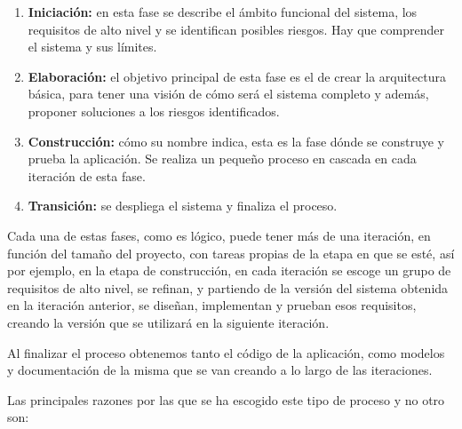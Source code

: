 \begin{enumerate}

    \item \textbf{Iniciación:} en esta fase se describe el ámbito funcional del sistema, los requisitos de alto nivel y se identifican posibles riesgos. Hay que comprender el sistema y sus límites.

    \item \textbf{Elaboración:} el objetivo principal de esta fase es el de crear la arquitectura básica, para tener una visión de cómo será el sistema completo y además, proponer soluciones a los riesgos identificados.

    \item \textbf{Construcción:} cómo su nombre indica, esta es la fase dónde se construye y prueba la aplicación. Se realiza un pequeño proceso en cascada en cada iteración de esta fase.

    \item \textbf{Transición:} se despliega el sistema y finaliza el proceso.

\end{enumerate}

Cada una de estas fases, como es lógico, puede tener más de una iteración, en función del tamaño del proyecto, con tareas propias de la etapa en que se esté, así por ejemplo, en la etapa de construcción, en cada iteración se escoge un grupo de requisitos de alto nivel, se refinan, y partiendo de la versión del sistema obtenida en la iteración anterior, se diseñan, implementan y prueban esos requisitos, creando la versión que se utilizará en la siguiente iteración.
\newline

Al finalizar el proceso obtenemos tanto el código de la aplicación, como modelos y documentación de la misma que se van creando a lo largo de las iteraciones.
\newline
{}



Las principales razones por las que se ha escogido este tipo de proceso y no otro son:

